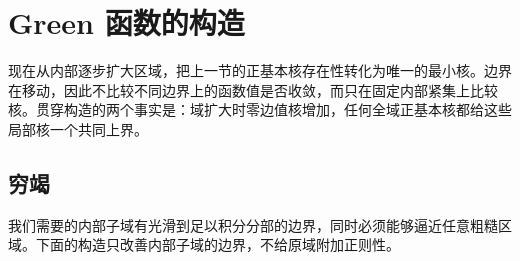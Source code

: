 \section{Green 函数的构造}
\label{b3:sec:1703}

现在从内部逐步扩大区域，把上一节的正基本核存在性转化为唯一的最小核。边界在移动，因此不比较不同边界上的函数值是否收敛，而只在固定内部紧集上比较核。贯穿构造的两个事实是：域扩大时零边值核增加，任何全域正基本核都给这些局部核一个共同上界。

\subsection{穷竭}
\label{b3:subsec:170301}

我们需要的内部子域有光滑到足以积分分部的边界，同时必须能够逼近任意粗糙区域。下面的构造只改善内部子域的边界，不给原域附加正则性。

